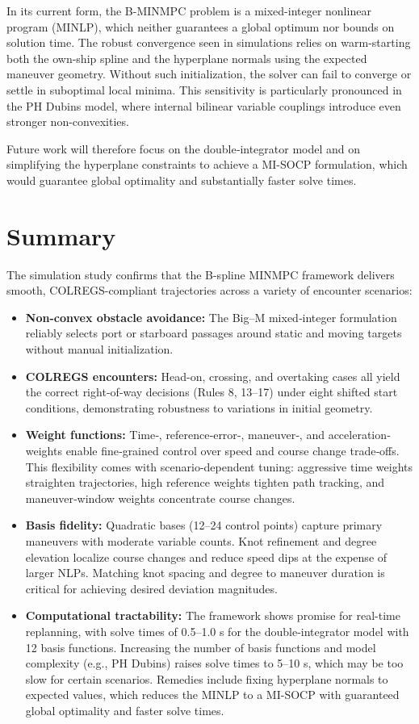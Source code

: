 In its current form, the B-MINMPC problem is a mixed-integer nonlinear program (MINLP), which neither guarantees a global optimum nor bounds on solution time.  The robust convergence seen in simulations relies on warm-starting both the own-ship spline and the hyperplane normals using the expected maneuver geometry.  Without such initialization, the solver can fail to converge or settle in suboptimal local minima.  This sensitivity is particularly pronounced in the PH Dubins model, where internal bilinear variable couplings introduce even stronger non-convexities.

Future work will therefore focus on the double‐integrator model and on simplifying the hyperplane constraints to achieve a MI-SOCP formulation, which would guarantee global optimality and substantially faster solve times.

\section{Summary}

The simulation study confirms that the B-spline MINMPC framework delivers smooth, COLREGS-compliant trajectories across a variety of encounter scenarios:

\begin{itemize}
  \item \textbf{Non-convex obstacle avoidance:}  
    The Big–M mixed‐integer formulation reliably selects port or starboard passages around static and moving targets without manual initialization.
  \item \textbf{COLREGS encounters:}  
    Head-on, crossing, and overtaking cases all yield the correct right‐of‐way decisions (Rules 8, 13–17) under eight shifted start conditions, demonstrating robustness to variations in initial geometry. 
  \item \textbf{Weight functions:}  
    Time‐, reference‐error‐, maneuver‐, and acceleration‐weights enable fine‐grained control over speed and course change trade‐offs. This flexibility comes with scenario-dependent tuning: aggressive time weights straighten trajectories, high reference weights tighten path tracking, and maneuver‐window weights concentrate course changes. 
  \item \textbf{Basis fidelity:}  
    Quadratic bases (12–24 control points) capture primary maneuvers with moderate variable counts. Knot refinement and degree elevation localize course changes and reduce speed dips at the expense of larger NLPs. Matching knot spacing and degree to maneuver duration is critical for achieving desired deviation magnitudes.
  \item \textbf{Computational tractability:}
    The framework shows promise for real-time replanning, with solve times of 0.5–1.0 s for the double‐integrator model with 12 basis functions. Increasing the number of basis functions and model complexity (e.g., PH Dubins) raises solve times to 5–10 s, which may be too slow for certain scenarios. Remedies include fixing hyperplane normals to expected values, which reduces the MINLP to a MI-SOCP with guaranteed global optimality and faster solve times.
\end{itemize}

